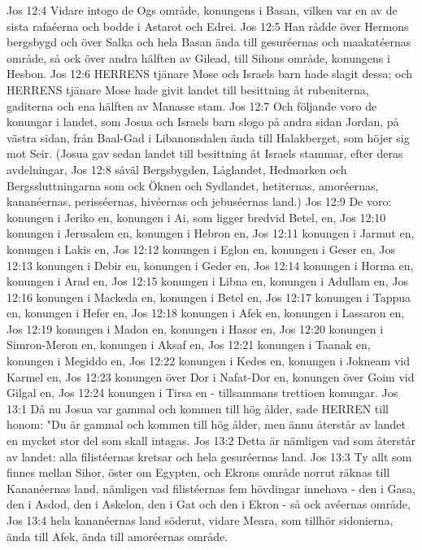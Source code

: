 Jos 12:4  Vidare intogo de Ogs område, konungens i Basan, vilken var en av de sista rafaéerna och bodde i Astarot och Edrei.
Jos 12:5  Han rådde över Hermons bergsbygd och över Salka och hela Basan ända till gesuréernas och maakatéernas område, så ock över andra hälften av Gilead, till Sihons område, konungens i Hesbon.
Jos 12:6  HERRENS tjänare Mose och Israels barn hade slagit dessa; och HERRENS tjänare Mose hade givit landet till besittning åt rubeniterna, gaditerna och ena hälften av Manasse stam.
Jos 12:7  Och följande voro de konungar i landet, som Josua och Israels barn slogo på andra sidan Jordan, på västra sidan, från Baal-Gad i Libanonsdalen ända till Halakberget, som höjer sig mot Seir. (Josua gav sedan landet till besittning åt Israels stammar, efter deras avdelningar,
Jos 12:8  såväl Bergsbygden, Låglandet, Hedmarken och Bergssluttningarna som ock Öknen och Sydlandet, hetiternas, amoréernas, kananéernas, perisséernas, hivéernas och jebuséernas land.)
Jos 12:9  De voro: konungen i Jeriko en, konungen i Ai, som ligger bredvid Betel, en,
Jos 12:10  konungen i Jerusalem en, konungen i Hebron en,
Jos 12:11  konungen i Jarmut en, konungen i Lakis en,
Jos 12:12  konungen i Eglon en, konungen i Geser en,
Jos 12:13  konungen i Debir en, konungen i Geder en,
Jos 12:14  konungen i Horma en, konungen i Arad en,
Jos 12:15  konungen i Libna en, konungen i Adullam en,
Jos 12:16  konungen i Mackeda en, konungen i Betel en,
Jos 12:17  konungen i Tappua en, konungen i Hefer en,
Jos 12:18  konungen i Afek en, konungen i Lassaron en,
Jos 12:19  konungen i Madon en, konungen i Hasor en,
Jos 12:20  konungen i Simron-Meron en, konungen i Aksaf en,
Jos 12:21  konungen i Taanak en, konungen i Megiddo en,
Jos 12:22  konungen i Kedes en, konungen i Jokneam vid Karmel en,
Jos 12:23  konungen över Dor i Nafat-Dor en, konungen över Goim vid Gilgal en,
Jos 12:24  konungen i Tirsa en - tillsammans trettioen konungar.
Jos 13:1  Då nu Josua var gammal och kommen till hög ålder, sade HERREN till honom: "Du är gammal och kommen till hög ålder, men ännu återstår av landet en mycket stor del som skall intagas.
Jos 13:2  Detta är nämligen vad som återstår av landet: alla filistéernas kretsar och hela gesuréernas land.
Jos 13:3  Ty allt som finnes mellan Sihor, öster om Egypten, och Ekrons område norrut räknas till Kananéernas land, nämligen vad filistéernas fem hövdingar innehava - den i Gasa, den i Asdod, den i Askelon, den i Gat och den i Ekron - så ock avéernas område,
Jos 13:4  hela kananéernas land söderut, vidare Meara, som tillhör sidonierna, ända till Afek, ända till amoréernas område.
